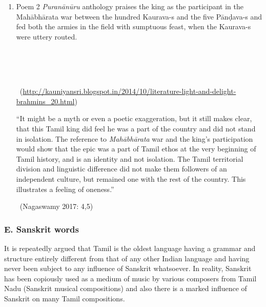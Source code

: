 \begin{enumerate}[{\rm 1.}]
 \item 
 Poem 2 \textit{Puranānūru} anthology praises the king as the participant in the Mahābhārata war between the hundred Kaurava-s and the five Pānḍava-s and fed both the armies in the field with sumptuous feast, when the Kaurava-s were uttery routed.

\begin{myquote}
\\\\\\

~\hfill (\url{http://kauniyansri.blogspot.in/2014/10/literature-light-and-delight-brahmins_20.html})
\end{myquote}

\begin{myquote}
“It might be a myth or even a poetic exaggeration, but it still makes clear, that this Tamil king did feel he was a part of the country and did not stand in isolation. The reference to \textit{Mahābhārata} war and the king’s participation would show that the epic was a part of Tamil ethos at the very beginning of Tamil history, and is an identity and not isolation. The Tamil territorial division and linguistic difference did not make them followers of an independent culture, but remained one with the rest of the country. This illustrates a feeling of oneness.”

~\hfill (Nagaswamy 2017: 4,5)
\end{myquote}


\end{enumerate}


\subsubsection*{E. Sanskrit words}

It is repeatedly argued that Tamil is the oldest language having a grammar and structure entirely different from that of any other Indian language and having never been subject to any influence of Sanskrit whatsoever. In reality, Sanskrit has been copiously used as a medium of music by various composers from Tamil Nadu (Sanskrit musical compositions) and also there is a marked influence of Sanskrit on many Tamil compositions.

